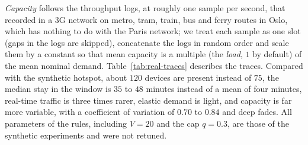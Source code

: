 \emph{Capacity} follows the throughput logs, at roughly one sample per second, that \citet{riiser2013commute} recorded in a 3G network on metro, tram, train, bus and ferry routes in Oslo, which has nothing to do with the Paris network; we treat each sample as one slot (gaps in the logs are skipped), concatenate the logs in random order and scale them by a constant so that mean capacity is a multiple (the \emph{load}, $1$ by default) of the mean nominal demand.
Table~\ref{tab:real-traces} describes the traces.
Compared with the synthetic hotspot, about $120$ devices are present instead of $75$, the median stay in the window is $35$ to $48$ minutes instead of a mean of four minutes, real-time traffic is three times rarer, elastic demand is light, and capacity is far more variable, with a coefficient of variation of $0.70$ to $0.84$ and deep fades.
All parameters of the rules, including $V=20$ and the cap $q=0.3$, are those of the synthetic experiments and were not retuned.

\begin{table}[t]
\centering
\caption{Share of sessions classified as video-like and game-like, and median session rates of each group (sessions since January 2025).}
\label{tab:real-classes}
\resizebox{0.85\linewidth}{!}{}
\end{table}

\begin{table}[t]
\centering
\caption{Trace-driven scenario: two-hour windows of the Paris public Wi-Fi session logs, with capacity from 3G commute logs scaled to load $1$.}
\label{tab:real-traces}
\resizebox{\linewidth}{!}{}
\end{table}

\begin{table}[t]
\centering
\caption{Trace-driven scenario, site PW0127, load $1$, truthful devices (mean over six traces $\pm$ half-width of the 95\% interval). The premium target is $0.8$.}
\label{tab:real-compare}
\resizebox{\linewidth}{!}{}
\end{table}

\begin{table}[t]
\centering
\caption{Trace-driven scenario, site PW0127: RT success and elastic rate at three loads (mean over six traces).}
\label{tab:real-load}

\end{table}

\begin{table}[t]
\centering
\caption{Trace-driven scenario, site PW0127, load $1$: sensitivity to the classification rule and to the tier assumption.}
\label{tab:real-variants}
\resizebox{\linewidth}{!}{}
\end{table}

